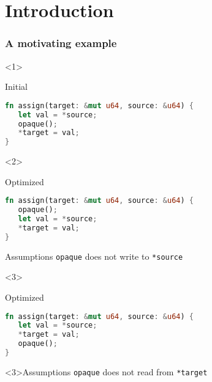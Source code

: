 \begin{frame}
    \titlepage
\end{frame}

\section{Introduction}

\begin{frame}[fragile,t]
    \frametitle{A motivating example}
    \begin{onlyenv}<1>
        \begin{block}{Initial}
            \begin{minipage}{\textwidth}
                \begin{lstlisting}[language=rust]
fn assign(target: &mut u64, source: &u64) {
   let val = *source;
   opaque();
   *target = val;
}
                \end{lstlisting}
            \end{minipage}
        \end{block}
    \end{onlyenv}

    \begin{onlyenv}<2>
        \begin{block}{Optimized}
            \begin{minipage}{\textwidth}
                \begin{lstlisting}[language=rust, escapechar=!]
fn assign(target: &mut u64, source: &u64) {
   opaque();
   let val = *source;
   *target = val;
}
                \end{lstlisting}
            \end{minipage}
        \end{block}
        \begin{block}{Assumptions}
            \texttt{opaque} does not write to \texttt{*source}
        \end{block}
    \end{onlyenv}

    \begin{onlyenv}<3>
        \begin{block}{Optimized}
            \begin{minipage}{\textwidth}
                \begin{lstlisting}[language=rust, escapechar=!]
fn assign(target: &mut u64, source: &u64) {
   let val = *source;
   *target = val;
   opaque();
}
                \end{lstlisting}
            \end{minipage}
        \end{block}
        \begin{block}<3>{Assumptions}
            \texttt{opaque} does not read from \texttt{*target}
        \end{block}
    \end{onlyenv}
\end{frame}

